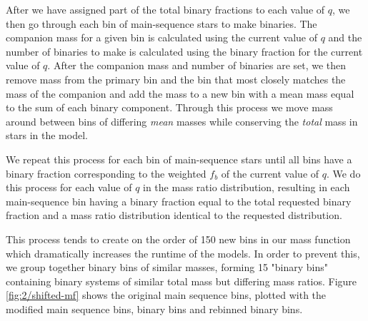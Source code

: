 After we have assigned part of the total binary fractions to each value of $q$, we then go through
each bin of main-sequence stars to make binaries. The companion mass for a given bin is calculated
using the current value of $q$ and the number of binaries to make is calculated using the binary
fraction for the current value of $q$. After the companion mass and number of binaries are set, we
then remove mass from the primary bin and the bin that most closely matches the mass of the companion
and add the mass to a new bin with a mean mass equal to the sum of each binary component. Through
this process we move mass around between bins of differing \emph{mean} masses while conserving the
\emph{total} mass in stars in the model.


We repeat this process for each bin of main-sequence stars until all bins have a binary fraction
corresponding to the weighted $f_b$ of the current value of $q$. We do this process for each value
of $q$ in the mass ratio distribution, resulting in each main-sequence bin having a binary fraction
equal to the total requested binary fraction and a mass ratio distribution identical to the
requested distribution.


This process tends to create on the order of 150 new bins in our mass function which dramatically
increases the runtime of the  models. In order to prevent this, we group together binary
bins of similar masses, forming 15 "binary bins" containing binary systems of similar total mass but
differing mass ratios. Figure \ref{fig:2/shifted-mf} shows the original main sequence bins, plotted
with the modified main sequence bins, binary bins and rebinned binary bins.



